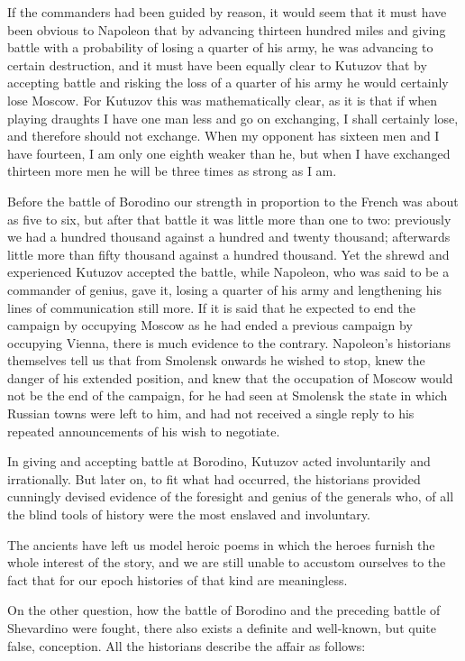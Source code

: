 If the commanders had been guided by reason, it would seem that
it must have been obvious to Napoleon that by advancing thirteen
hundred miles and giving battle with a probability of losing a
quarter of his army, he was advancing to certain destruction, and
it must have been equally clear to Kutuzov that by accepting
battle and risking the loss of a quarter of his army he would
certainly lose Moscow. For Kutuzov this was mathematically clear,
as it is that if when playing draughts I have one man less and go
on exchanging, I shall certainly lose, and therefore should not
exchange. When my opponent has sixteen men and I have fourteen, I
am only one eighth weaker than he, but when I have exchanged
thirteen more men he will be three times as strong as I am.

Before the battle of Borodino our strength in proportion to the
French was about as five to six, but after that battle it was
little more than one to two: previously we had a hundred thousand
against a hundred and twenty thousand; afterwards little more
than fifty thousand against a hundred thousand. Yet the shrewd
and experienced Kutuzov accepted the battle, while Napoleon, who
was said to be a commander of genius, gave it, losing a quarter
of his army and lengthening his lines of communication still
more. If it is said that he expected to end the campaign by
occupying Moscow as he had ended a previous campaign by occupying
Vienna, there is much evidence to the contrary. Napoleon's
historians themselves tell us that from Smolensk onwards he
wished to stop, knew the danger of his extended position, and
knew that the occupation of Moscow would not be the end of the
campaign, for he had seen at Smolensk the state in which Russian
towns were left to him, and had not received a single reply to
his repeated announcements of his wish to negotiate.

In giving and accepting battle at Borodino, Kutuzov acted
involuntarily and irrationally. But later on, to fit what had
occurred, the historians provided cunningly devised evidence of
the foresight and genius of the generals who, of all the blind
tools of history were the most enslaved and involuntary.

The ancients have left us model heroic poems in which the heroes
furnish the whole interest of the story, and we are still unable
to accustom ourselves to the fact that for our epoch histories of
that kind are meaningless.

On the other question, how the battle of Borodino and the
preceding battle of Shevardino were fought, there also exists a
definite and well-known, but quite false, conception. All the
historians describe the affair as follows:

